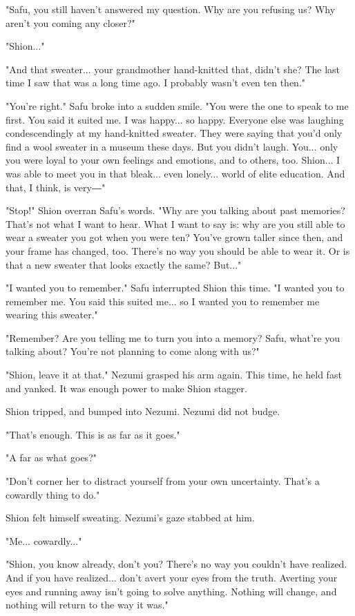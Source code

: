"Safu, you still haven't answered my question. Why are you refusing us?
Why aren't you coming any closer?"

"Shion..."

"And that sweater... your grandmother hand-knitted that, didn't she? The
last time I saw that was a long time ago. I probably wasn't even ten
then."

"You're right." Safu broke into a sudden smile. "You were the one to
speak to me first. You said it suited me. I was happy... so happy.
Everyone else was laughing condescendingly at my hand-knitted sweater.
They were saying that you'd only find a wool sweater in a museum these
days. But you didn't laugh. You... only you were loyal to your own
feelings and emotions, and to others, too. Shion... I was able to meet
you in that bleak... even lonely... world of elite education. And that,
I think, is very―"

"Stop!" Shion overran Safu's words. "Why are you talking about past
memories? That's not what I want to hear. What I want to say is: why are
you still able to wear a sweater you got when you were ten? You've grown
taller since then, and your frame has changed, too. There's no way you
should be able to wear it. Or is that a new sweater that looks exactly
the same? But..."

"I wanted you to remember." Safu interrupted Shion this time. "I wanted
you to remember me. You said this suited me... so I wanted you to
remember me wearing this sweater."

"Remember? Are you telling me to turn you into a memory? Safu, what're
you talking about? You're not planning to come along with us?"

"Shion, leave it at that." Nezumi grasped his arm again. This time, he
held fast and yanked. It was enough power to make Shion stagger.

Shion tripped, and bumped into Nezumi. Nezumi did not budge.

"That's enough. This is as far as it goes."

"A far as what goes?"

"Don't corner her to distract yourself from your own uncertainty. That's
a cowardly thing to do."

Shion felt himself sweating. Nezumi's gaze stabbed at him.

"Me... cowardly..."

"Shion, you know already, don't you? There's no way you couldn't have
realized. And if you have realized... don't avert your eyes from the
truth. Averting your eyes and running away isn't going to solve
anything. Nothing will change, and nothing will return to the way it
was."

